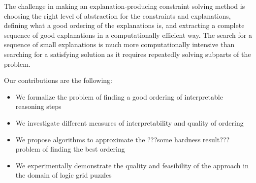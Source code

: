 The challenge in making an explanation-producing constraint solving method is choosing the right level of abstraction for the constraints and explanations, defining what a good ordering of the explanations is, and extracting a complete sequence of good explanations in a computationally efficient way. The search for a sequence of small explanations is much more computationally intensive than searching for a satisfying solution as it requires repeatedly solving subparts of the problem.

Our contributions are the following:
\begin{itemize}
	\item We formalize the problem of finding a good ordering of interpretable reasoning steps
	\item We investigate different measures of interpretability and quality of ordering
	\item We propose algorithms to approximate the ???some hardness result??? problem of finding the best ordering  
	\item We experimentally demonstrate the quality and feasibility of the approach in the domain of logic grid puzzles
\end{itemize}


